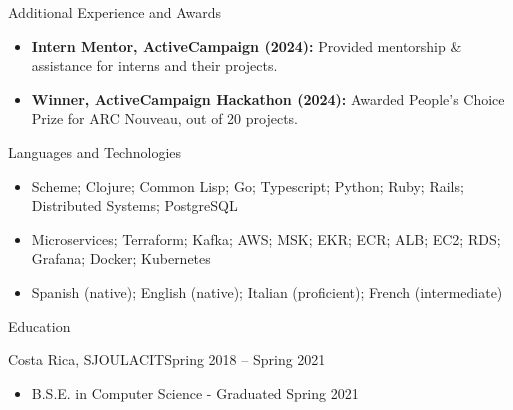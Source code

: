 \documentclass[]{mcdowellcv}
\begin{document}
	\begin{cvsection}{Additional Experience and Awards}
		\begin{cvsubsection}{}{}{}	
			\begin{itemize}
				\item \textbf{Intern Mentor, ActiveCampaign (2024):} Provided mentorship \& assistance for interns and their projects.
				\item \textbf{Winner, ActiveCampaign Hackathon (2024):} Awarded People's Choice Prize for ARC Nouveau, out of 20 projects.
			\end{itemize}
		\end{cvsubsection}
	\end{cvsection}
	\begin{cvsection}{Languages and Technologies}
		\begin{cvsubsection}{}{}{}	
			\begin{itemize}
				\item Scheme; Clojure; Common Lisp; Go; Typescript; Python; Ruby; Rails; Distributed Systems; PostgreSQL
				\item Microservices; Terraform; Kafka; AWS; MSK; EKR; ECR; ALB; EC2; RDS; Grafana; Docker; Kubernetes
				\item Spanish (native); English (native); Italian (proficient); French (intermediate)
			\end{itemize}
		\end{cvsubsection}
	\end{cvsection}
	\begin{cvsection}{Education}
		\begin{cvsubsection}{Costa Rica, SJO}{ULACIT}{Spring 2018 -- Spring 2021}
			\begin{itemize}
				\item B.S.E. in Computer Science - Graduated Spring 2021
			\end{itemize}
		\end{cvsubsection}
	\end{cvsection}
	
\end{document}
